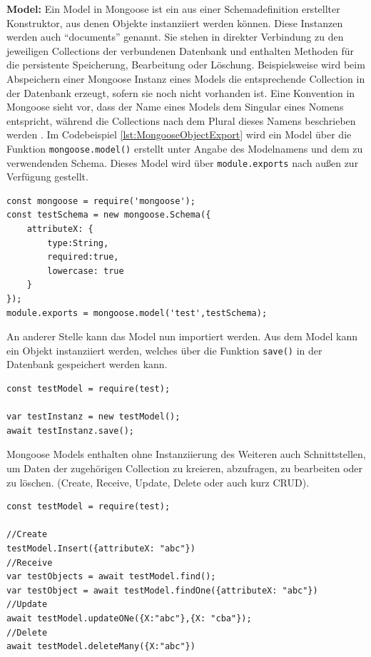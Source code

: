 \newpage
\noindent
\textbf{Model:}
Ein Model in Mongoose ist ein aus einer Schemadefinition erstellter Konstruktor, aus denen Objekte instanziiert werden können. Diese Instanzen werden auch \enquote{documents} genannt. Sie stehen in direkter Verbindung zu den jeweiligen Collections der verbundenen Datenbank und enthalten Methoden für die persistente Speicherung, Bearbeitung oder Löschung. Beispielsweise wird beim Abspeichern einer Mongoose Instanz eines Models die entsprechende Collection in der Datenbank erzeugt, sofern sie noch nicht vorhanden ist. Eine Konvention in Mongoose sieht vor, dass der Name eines Models dem Singular eines Nomens entspricht, während die Collections nach dem Plural dieses Namens beschrieben werden \cite{Node3.2}. Im Codebeispiel \ref{lst:MongooseObjectExport} wird ein Model über die Funktion \texttt{mongoose.model()} erstellt unter Angabe des Modelnamens und dem zu verwendenden Schema. Dieses Model wird über \texttt{module.exports} nach außen zur Verfügung gestellt.\\

\begin{lstlisting}[caption=Model erstellen und exportierenn,label=lst:MongooseObjectExport]
const mongoose = require('mongoose');
const testSchema = new mongoose.Schema({
	attributeX: {
		type:String,
		required:true,
		lowercase: true
	}
});
module.exports = mongoose.model('test',testSchema);
\end{lstlisting}

\noindent
An anderer Stelle kann das Model nun importiert werden. Aus dem Model kann ein Objekt instanziiert werden, welches über die Funktion \texttt{save()} in der Datenbank gespeichert werden kann.\\

\begin{lstlisting}[caption=Model importieren - Objekt instanziieren und persistent speichern,label=lst:MongooseObjectInstance]
const testModel = require(test);

var testInstanz = new testModel();
await testInstanz.save();
\end{lstlisting}

\noindent
Mongoose Models enthalten ohne Instanziierung des Weiteren auch Schnittstellen, um Daten der zugehörigen Collection zu kreieren, abzufragen, zu bearbeiten oder zu löschen. (Create, Receive, Update, Delete oder auch kurz CRUD).
\newline

\begin{lstlisting}[caption=CRUD-Beispielfunktionen eines Mongoose-Models,label=lst:MongooseCrud]
const testModel = require(test);

//Create
testModel.Insert({attributeX: "abc"})
//Receive
var testObjects = await testModel.find();
var testObject = await testModel.findOne({attributeX: "abc"})
//Update
await testModel.updateONe({X:"abc"},{X: "cba"});
//Delete
await testModel.deleteMany({X:"abc"})
\end{lstlisting}

